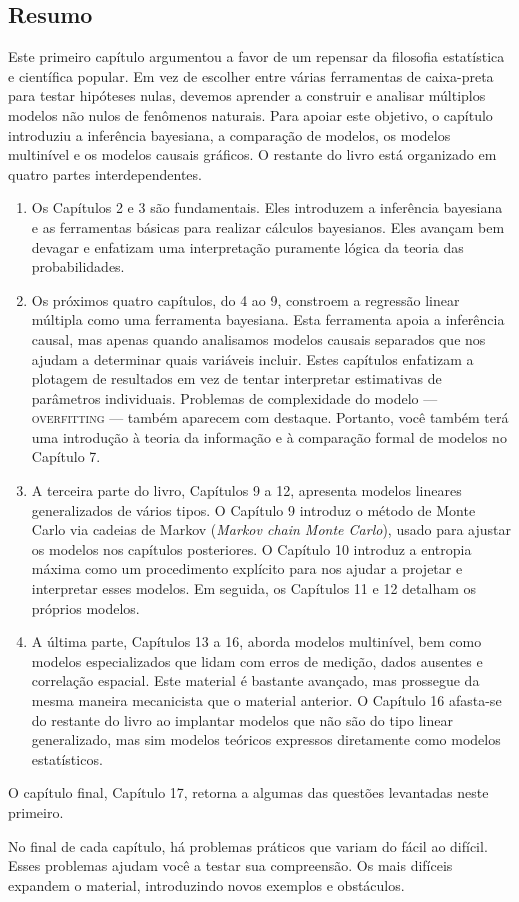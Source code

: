 \subsection{Resumo}

Este primeiro capítulo argumentou a favor de um repensar da filosofia estatística e científica popular. Em vez de escolher entre várias ferramentas de caixa-preta para testar hipóteses nulas, devemos aprender a construir e analisar múltiplos modelos não nulos de fenômenos naturais. Para apoiar este objetivo, o capítulo introduziu a inferência bayesiana, a comparação de modelos, os modelos multinível e os modelos causais gráficos. O restante do livro está organizado em quatro partes interdependentes.

\begin{enumerate}
  \item Os Capítulos 2 e 3 são fundamentais. Eles introduzem a inferência bayesiana e as ferramentas básicas para realizar cálculos bayesianos. Eles avançam bem devagar e enfatizam uma interpretação puramente lógica da teoria das probabilidades.
  \item Os próximos quatro capítulos, do 4 ao 9, constroem a regressão linear múltipla como uma ferramenta bayesiana. Esta ferramenta apoia a inferência causal, mas apenas quando analisamos modelos causais separados que nos ajudam a determinar quais variáveis incluir. Estes capítulos enfatizam a plotagem de resultados em vez de tentar interpretar estimativas de parâmetros individuais. Problemas de complexidade do modelo — \textsc{overfitting} — também aparecem com destaque. Portanto, você também terá uma introdução à teoria da informação e à comparação formal de modelos no Capítulo 7.
  \item A terceira parte do livro, Capítulos 9 a 12, apresenta modelos lineares generalizados de vários tipos. O Capítulo 9 introduz o método de Monte Carlo via cadeias de Markov (\textit{Markov chain Monte Carlo}), usado para ajustar os modelos nos capítulos posteriores. O Capítulo 10 introduz a entropia máxima como um procedimento explícito para nos ajudar a projetar e interpretar esses modelos. Em seguida, os Capítulos 11 e 12 detalham os próprios modelos.
  \item A última parte, Capítulos 13 a 16, aborda modelos multinível, bem como modelos especializados que lidam com erros de medição, dados ausentes e correlação espacial. Este material é bastante avançado, mas prossegue da mesma maneira mecanicista que o material anterior. O Capítulo 16 afasta-se do restante do livro ao implantar modelos que não são do tipo linear generalizado, mas sim modelos teóricos expressos diretamente como modelos estatísticos.
\end{enumerate}

O capítulo final, Capítulo 17, retorna a algumas das questões levantadas neste primeiro.

No final de cada capítulo, há problemas práticos que variam do fácil ao difícil. Esses problemas ajudam você a testar sua compreensão. Os mais difíceis expandem o material, introduzindo novos exemplos e obstáculos.